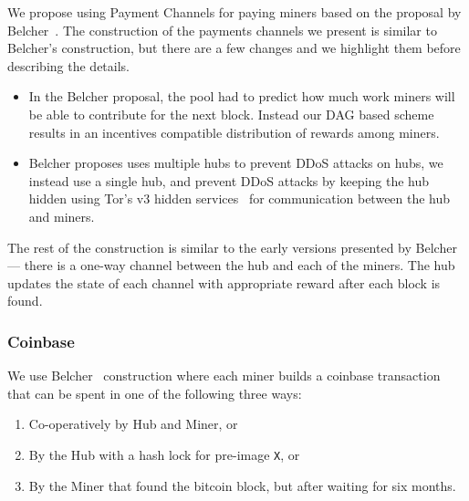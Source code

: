 \documentclass{article}
\begin{document}
We propose using Payment Channels for paying miners based on the
proposal by Belcher~\cite{channels-for-rewards}. The construction of
the payments channels we present is similar to Belcher's construction,
but there are a few changes and we highlight them before describing
the details.

\begin{itemize}
\item In the Belcher proposal, the pool had to predict how much work
  miners will be able to contribute for the next block. Instead our
  DAG based scheme results in an incentives compatible distribution of
  rewards among miners.
\item Belcher proposes uses multiple hubs to prevent DDoS attacks on
  hubs, we instead use a single hub, and prevent DDoS attacks by
  keeping the hub hidden using Tor's v3 hidden
  services~\cite{tor-design} for communication between the hub and
  miners.
\end{itemize}

The rest of the construction is similar to the early versions
presented by Belcher --- there is a one-way channel between the hub
and each of the miners. The hub updates the state of each channel with
appropriate reward after each block is found.



\subsubsection{Coinbase}

We use Belcher~\cite{channels-for-rewards} construction where each
miner builds a coinbase transaction that can be spent in one of the
following three ways:

\begin{enumerate}
\item Co-operatively by Hub and Miner, or
\item By the Hub with a hash lock for pre-image \verb|X|, or
\item By the Miner that found the bitcoin block, but after waiting for
  six months.
\end{enumerate}
\end{document}
